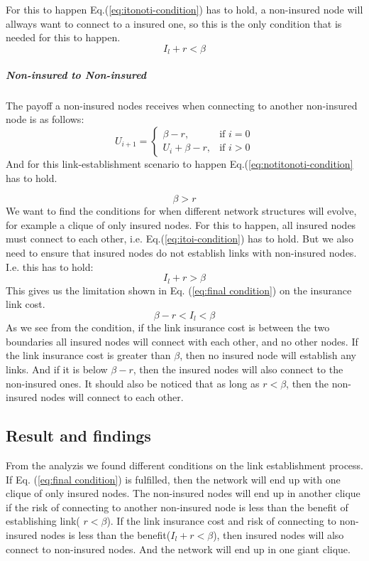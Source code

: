 For this to happen Eq.(\ref{eq:itonoti-condition}) has to hold, a non-insured node will allways want to connect to a insured one, so this is the only condition that is needed for this to happen.
\begin{equation}
I_{l}+r<\beta
\label{eq:itonoti-condition}
\end{equation}
\subparagraph{Non-insured to Non-insured}
The payoff a non-insured nodes receives when connecting to another non-insured node is as follows:
\begin{equation}
    U_{i+1}= 
\begin{cases}
    \beta -r,& \text{if } i = 0\\
    U_{i}+\beta -r,& \text{if }  i>0
   
\end{cases}
\label{eq:notitonotimodel2}
\end{equation}
And for this link-establishment scenario to happen Eq.(\ref{eq:notitonoti-condition} has to hold.

\begin{equation}
\beta>r
\label{eq:notitonoti-condition}
\end{equation}
We want to find the conditions for when different network structures will evolve, for example a clique of only insured nodes. For this to happen, all insured nodes must connect to each other, i.e. Eq.(\ref{eq:itoi-condition}) has to hold. But we also need to ensure that insured nodes do not establish links with non-insured nodes. I.e. this has to hold:
\begin{equation}
I_{l}+r>\beta
\end{equation}
This gives us the limitation shown in Eq. (\ref{eq:final condition}) on the insurance link cost.
\begin{equation}
\beta-r<I_{l}<\beta
\label{eq:final condition}
\end{equation}
As we see from the condition, if the link insurance cost is between the two boundaries all insured nodes will connect with each other, and no other nodes. If the link insurance cost is greater than $\beta$, then no insured node will establish any links. And if it is below $\beta-r$, then the insured nodes will also connect to the non-insured ones.
It should also be noticed that as long as $r<\beta$, then the non-insured nodes will connect to each other. 

\subsection{Result and findings}
From the analyzis we found different conditions on the link establishment process. If Eq. (\ref{eq:final condition}) is fulfilled, then the network will end up with one clique of only insured nodes. The non-insured nodes will end up in another clique if the risk of connecting to another non-insured node is less than the benefit of establishing link( $r<\beta$).
If the link insurance cost and risk of connecting to non-insured nodes is less than the benefit($I_{l}+r<\beta$), then insured nodes will also connect to non-insured nodes. And the network will end up in one giant clique.


